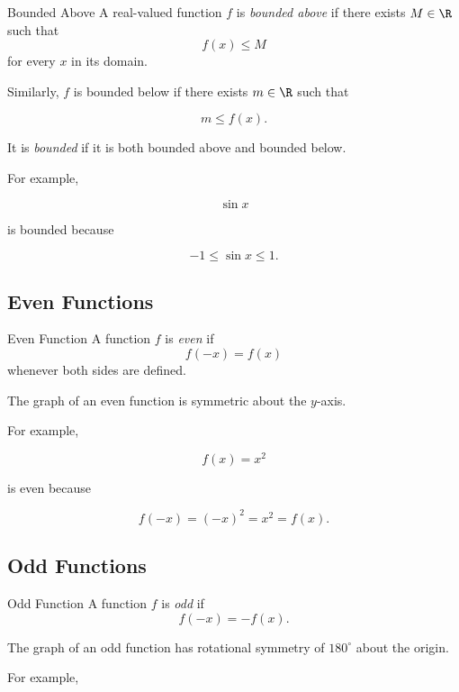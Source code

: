 \begin{definitionbox}{Bounded Above}
A real-valued function \(f\) is \emph{bounded above} if there exists
\(M\in\R\) such that
\[ f(x)\leq M \]
for every \(x\) in its domain.
\end{definitionbox}

Similarly, \(f\) is bounded below if there exists \(m\in\R\) such that

\[ m\leq f(x). \]

It is \emph{bounded} if it is both bounded above and bounded below.

For example,

\[ \sin x \]

is bounded because

\[ -1\leq\sin x\leq1. \]

\subsection{Even Functions}
\label{subsec:even-functions}

\begin{definitionbox}{Even Function}
A function \(f\) is \emph{even} if
\[ f(-x)=f(x) \]
whenever both sides are defined.
\end{definitionbox}

The graph of an even function is symmetric about the \(y\)-axis.

For example,

\[ f(x)=x^2 \]

is even because

\[ f(-x)=(-x)^2=x^2=f(x). \]

\subsection{Odd Functions}
\label{subsec:odd-functions}

\begin{definitionbox}{Odd Function}
A function \(f\) is \emph{odd} if
\[ f(-x)=-f(x). \]
\end{definitionbox}

The graph of an odd function has rotational symmetry of \(180^\circ\) about
the origin.

For example,

